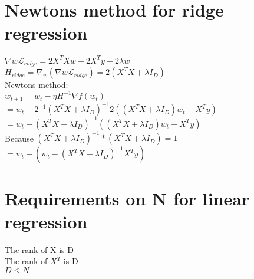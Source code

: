 \section{Newtons method for ridge regression}
$\nabla{w}\mathcal{L}_{ridge}=2X^{T}Xw-2X^{T}y+2\lambda w$\\ $H_{ridge}=\nabla_{w}
(\nabla{w}\mathcal{L}_{ridge})=2(X^{T}X+\lambda I_{D})$\\ Newtons method:\\
$w_{t+1}=w_{t}-\eta H^{-1}\nabla f(w_{t})$\\ $=w_{t}-2^{-1}(X^{T}X+\lambda I_{D})
^{-1}2((X^{T}X+\lambda I_{D})w_{t}-X^{T}y)$\\
$=w_{t}-(X^{T}X+\lambda I_{D})^{-1}((X^{T}X+\lambda I_{D})w_{t}-X^{T}y)$\\ Because
$(X^{T}X+\lambda I_{D})^{-1}*(X^{T}X+\lambda I_{D})=1$\\
$=w_{t}-(w_{t}-( X^{T}X+\lambda I_{D})^{-1}X^{T}y)$
\section{Requirements on N for linear regression}
The rank of X is D\\ The rank of $X^{T}$ is D\\ $D \leq N$\\
